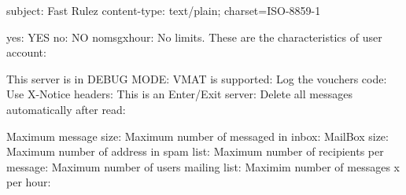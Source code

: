 subject: Fast Rulez
content-type: text/plain; charset=ISO-8859-1 

yes: YES
no: NO
nomsgxhour: No limits.
These are the characteristics of user account:

This server is in DEBUG MODE: 			%
VMAT is supported: 				%
Log the vouchers code: 				%
Use X-Notice headers: 				%
This is an Enter/Exit server: 			%
Delete all messages automatically after read: 	%

Maximum message size: 				%
Maximum number of messaged in inbox: 		%
MailBox size:					%
Maximum number of address in spam list: 	%
Maximum number of recipients per message: 	%
Maximum number of users mailing list: 		%
Maximim number of messages x per hour:		%
	
